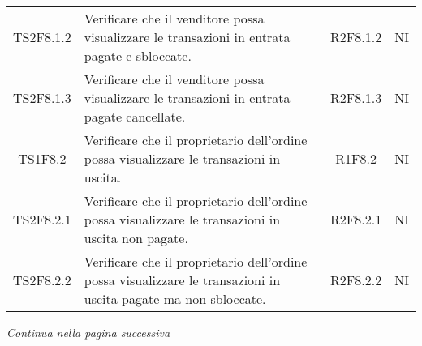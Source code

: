 \begin{table}[H]
\begin{tabular}{c|p{8cm}|c|c}
    TS2F8.1.2 & Verificare che il venditore possa visualizzare le transazioni in entrata pagate e sbloccate.                              & R2F8.1.2 & NI \\
    TS2F8.1.3 & Verificare che il venditore possa visualizzare le transazioni in entrata pagate cancellate.                               & R2F8.1.3 & NI \\
    TS1F8.2   & Verificare che il proprietario dell'ordine possa visualizzare le transazioni in uscita.                                   & R1F8.2   & NI \\
    TS2F8.2.1 & Verificare che il proprietario dell'ordine possa visualizzare le transazioni in uscita non pagate.                        & R2F8.2.1 & NI \\
    TS2F8.2.2 & Verificare che il proprietario dell'ordine possa visualizzare le transazioni in uscita pagate ma non sbloccate.           & R2F8.2.2 & NI \\
    \end{tabular}
\end{table}
\begin{center}
  \textit{\small Continua nella pagina successiva}
\end{center}
